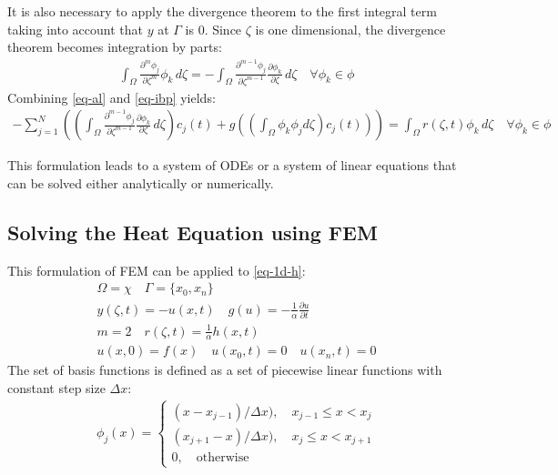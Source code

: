 It is also necessary to apply the divergence theorem to the first integral term taking into account that \(y\) at \(\Gamma\) is 0.
Since \(\zeta\) is one dimensional, the divergence theorem becomes integration by parts:
\begin{gather}
\int_{\Omega} \frac{\partial^{m} \phi_{j}}{\partial \zeta^{m}} \phi_{k} \, d\zeta = - \int_{\Omega} \frac{\partial^{m-1} \phi_{j}}{\partial \zeta^{m-1}} \frac{\partial \phi_{k}}{\partial \zeta} \, d\zeta \quad \forall \phi_{k} \in \phi \label{eq-ibp}
\end{gather}
Combining \ref{eq-al} and \ref{eq-ibp} yields:
\begin{gather}
-\sum_{j = 1}^{N} ((\int_{\Omega} \frac{\partial^{m-1} \phi_{j}}{\partial \zeta^{m-1}} \frac{\partial \phi_{k}}{\partial \zeta} \, d\zeta) c_{j}(t) + g((\int_{\Omega} \phi_k \phi_j d\zeta) c_{j}(t)))  = \int_{\Omega}  r(\zeta, t) \phi_{k}        \, d\zeta \quad \forall \phi_{k} \in \phi \label{eq-fem}
\end{gather}

This formulation leads to a system of ODEs or a system of linear equations that can be solved either analytically or numerically.
\subsection{Solving the Heat Equation using FEM}
This formulation of FEM can be applied to \ref{eq-1d-h}:
\begin{gather}
\Omega = \chi \quad \Gamma = \{x_{0}, x_{n}\} \\
y(\zeta, t) = -u(x, t) \quad g(u) = -\frac{1}{\alpha} \frac{\partial u}{\partial t} \\
m = 2 \quad r(\zeta, t) = \frac{1}{\alpha} h(x,t) \\
u(x, 0) = f(x) \quad u(x_{0}, t) = 0 \quad u(x_{n}, t) = 0
\end{gather}
The set of basis functions is defined as a set of piecewise linear functions with constant step size \(\Delta x\):
\begin{gather}
    \phi_j(x)= 
\begin{cases}
    (x - x_{j-1}) / \Delta x), \quad x_{j-1} \leq x <  x_{j}\\
    (x_{j+1} - x) / \Delta x), \quad x_{j} \leq x <  x_{j + 1}\\
    0,              \quad \text{otherwise}
\end{cases}
\end{gather}
\cite{Gustafsson2011d}


